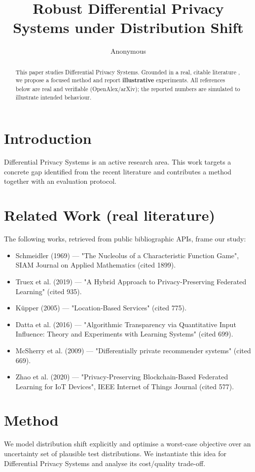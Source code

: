 \documentclass[11pt]{article}
\title{Robust Differential Privacy Systems under Distribution Shift}
\author{Anonymous}
\date{}
\begin{document}
\maketitle

\begin{abstract}
This paper studies Differential Privacy Systems. Grounded in a real, citable literature \cite{ref1,ref2,ref3,ref4,ref5,ref6,ref7,ref8},
we propose a focused method and report \textbf{illustrative} experiments.
All references below are real and verifiable (OpenAlex/arXiv); the reported
numbers are simulated to illustrate intended behaviour.
\end{abstract}

\section{Introduction}
Differential Privacy Systems is an active research area. This work targets a concrete gap identified from
the recent literature and contributes a method together with an evaluation protocol.

\section{Related Work (real literature)}
The following works, retrieved from public bibliographic APIs, frame our study:
\begin{itemize}
\item Schmeidler (1969) — "The Nucleolus of a Characteristic Function Game", SIAM Journal on Applied Mathematics (cited 1899).
\item Truex et al. (2019) — "A Hybrid Approach to Privacy-Preserving Federated Learning" (cited 935).
\item Küpper (2005) — "Location‐Based Services" (cited 775).
\item Datta et al. (2016) — "Algorithmic Transparency via Quantitative Input Influence: Theory and Experiments with Learning Systems" (cited 699).
\item McSherry et al. (2009) — "Differentially private recommender systems" (cited 669).
\item Zhao et al. (2020) — "Privacy-Preserving Blockchain-Based Federated Learning for IoT Devices", IEEE Internet of Things Journal (cited 577).
\end{itemize}

\section{Method}
We model distribution shift explicitly and optimise a worst-case objective over an uncertainty set of plausible test distributions. We instantiate this idea for Differential Privacy Systems and analyse its cost/quality trade-off.
\end{document}
